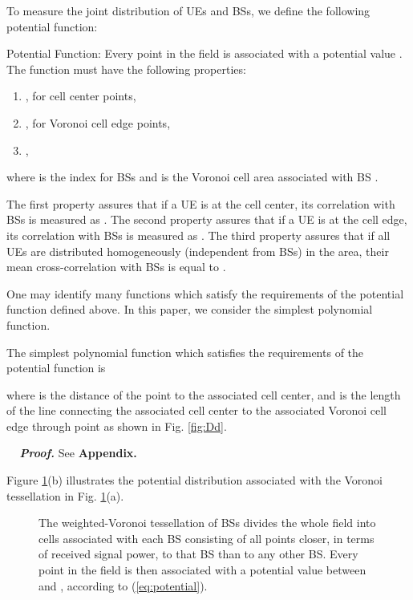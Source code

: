 \documentclass[journal]{IEEEtran}
\begin{document}
To measure the joint distribution of UEs and BSs, we define the following potential function:
\begin{definition}
Potential Function: Every point  in the field is associated with a potential value . The  function must have the following properties:
\begin{enumerate}
\item , for cell center points, 
\item , for Voronoi cell edge points,
\item ,
\end{enumerate}
where  is the index for BSs and  is the Voronoi cell area associated with BS .
\end{definition} 

The first property assures that if a UE is at the cell center, its correlation with BSs is measured as . The second property assures that if a UE is at the cell edge, its correlation with BSs is measured as . The third property assures that if all UEs are distributed homogeneously (independent from BSs) in the area, their mean cross-correlation with BSs is equal to .

One may identify many functions which satisfy the requirements of the potential function defined above. In this paper, we consider the simplest polynomial function.

\begin{lemma}
The simplest polynomial function which satisfies the requirements of the potential function is

where  is the distance of the point  to the associated cell center, and  is the length of the line connecting the associated cell center to the associated Voronoi cell edge through point  as shown in Fig. \ref{fig:Dd}.
\end{lemma}
\textbf{\textit{~~Proof.}} See \textbf{Appendix.}

Figure \ref{fig:infra}(b) illustrates the potential distribution associated with the Voronoi tessellation in Fig. \ref{fig:infra}(a).

\begin{figure}
\centering
{}
\caption{The weighted-Voronoi tessellation of BSs divides the whole field into cells associated with each BS consisting of all points closer, in terms of received signal power, to that BS than to any other BS. Every point in the field is then associated with a potential value between  and , according to (\ref{eq:potential}).}
\label{fig:infra}
\end{figure}
\end{document}

